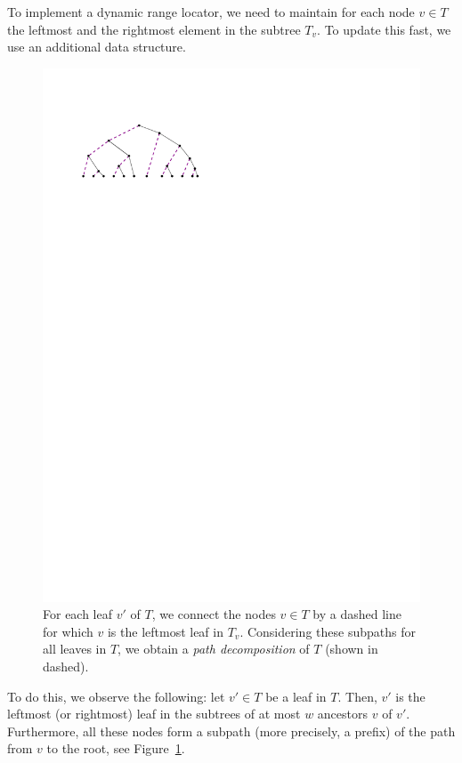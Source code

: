 \documentclass[a4paper,11pt]{article}
\newcommand{\?}{\mskip1.5mu}
\begin{document}
To implement a dynamic range locator, 
we need to maintain for each node $v \in T$ the
leftmost and the rightmost element in the subtree $T_v$.
To update this fast, we use an additional data structure.

\begin{figure}
\centering
\includegraphics{pathdecomp}
\caption{For each leaf $v'$ of $T$, we connect the nodes
$v \in T$ by a dashed line for which $v$ is the leftmost leaf in $T_v$.
Considering these
subpaths for all leaves in $T$, we obtain a \emph{path decomposition}
of $T$ (shown in dashed).}
\label{fig:pathdecomp}
\end{figure}
To do this, we observe the following: let $v' \in T$ be 
a leaf in $T$. Then, $v'$ is the leftmost (or rightmost)
leaf in the subtrees of at most $w$ ancestors $v$ of $v'$.
Furthermore, all these nodes form a subpath (more precisely,
a prefix) of the path from $v$ to the root, see Figure~\ref{fig:pathdecomp}.
\end{document}
